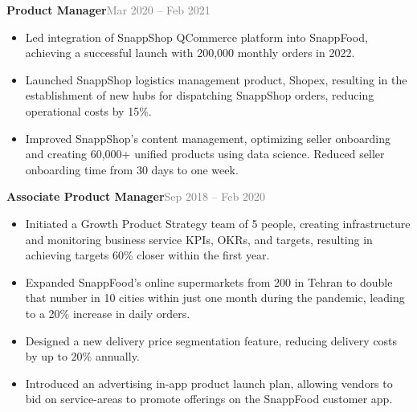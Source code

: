 \documentclass[a4paper,10.9pt]{article}
\newcommand{\position}[1]{\Large\bfseries #1}\vspace{0.2em}
\newcommand{\bulletitem}[1]{\item #1\vspace{0.1em}}
\newcommand{\graytext}[1]{\textcolor{grey}{#1}} %
\begin{document}
\begin{adjustwidth}{0.5cm}{0cm}
{{\position{Product Manager}}\hfill \large\graytext{Mar 2020 – Feb 2021}}
\normalsize
\begin{adjustwidth}{0.5cm}{0cm}
\begin{itemize}
  \bulletitem{Led integration of SnappShop QCommerce platform into SnappFood, achieving a successful launch with 200,000 monthly orders in 2022.}
  \bulletitem{Launched SnappShop logistics management product, Shopex, resulting in the establishment of new hubs for dispatching SnappShop orders, reducing operational costs by 15\%.}
  \bulletitem{Improved SnappShop’s content management, optimizing seller onboarding and creating 60,000+ unified products using data science. Reduced seller onboarding time from 30 days to one week.}
\end{itemize}
\end{adjustwidth}
\vspace{3pt}

{{\position{Associate Product Manager}}\hfill \large\graytext{Sep 2018 – Feb 2020}}
\normalsize
\begin{adjustwidth}{0.5cm}{0cm}
\begin{itemize}
  \bulletitem{Initiated a Growth Product Strategy team of 5 people, creating infrastructure and monitoring business service KPIs, OKRs, and targets, resulting in achieving targets 60\% closer within the first year.}
  \bulletitem{Expanded SnappFood’s online supermarkets from 200 in Tehran to double that number in 10 cities within just one month during the pandemic, leading to a 20\% increase in daily orders.}
  \bulletitem{Designed a new delivery price segmentation feature, reducing delivery costs by up to 20\% annually.}
  \bulletitem{Introduced an advertising in-app product launch plan, allowing vendors to bid on service-areas to promote offerings on the SnappFood customer app.}
\end{itemize}
\end{adjustwidth}
\end{adjustwidth}

\end{document}
